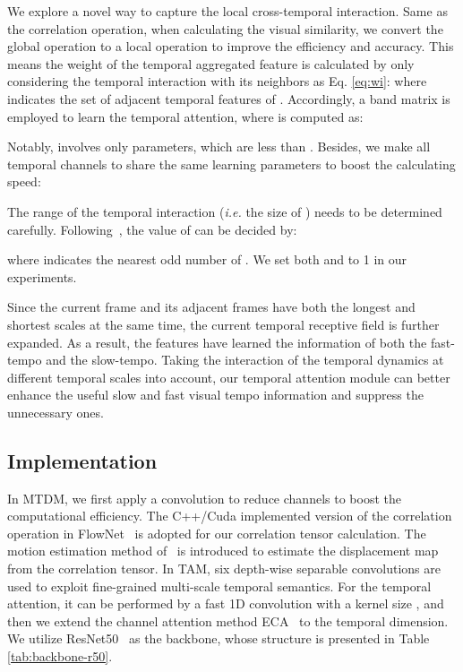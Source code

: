 \documentclass[journal]{IEEEtran}
\begin{document}
We explore a novel way to capture the local cross-temporal interaction. Same as the correlation operation, when calculating the visual similarity, we convert the global operation to a local operation to improve the efficiency and accuracy. This means the weight of the temporal aggregated feature  is calculated by only considering the temporal interaction with its  neighbors as Eq. \ref{eq:wi}:
where  indicates the set of  adjacent temporal features of . Accordingly, a band matrix  is employed to learn the temporal attention, where  is computed as:


Notably,  involves only  parameters, which are less than . Besides, we make all temporal channels to share the same learning parameters to boost the calculating speed:

The range of the temporal interaction (\textit{i.e.} the size of ) needs to be determined carefully. Following~\cite{Wang_2020_CVPR_eca}, the value of  can be decided by:

where  indicates the nearest odd number of . We set both  and  to 1 in our experiments.

Since the current frame and its adjacent frames have both the longest and shortest scales at the same time, the current temporal receptive field is further expanded. As a result, the features have learned the information of both the fast-tempo and the slow-tempo. Taking the interaction of the temporal dynamics at different temporal scales into account, our temporal attention module can better enhance the useful slow and fast visual tempo information and suppress the unnecessary ones.


\subsection{Implementation}
In MTDM, we first apply a  convolution to reduce channels to boost the computational efficiency.
The C++/Cuda implemented version of the correlation operation in FlowNet~\cite{dosovitskiy2015flownet} is adopted for our correlation tensor calculation.
The motion estimation method of~\cite{kwon2020motionsqueeze} is introduced to estimate the displacement map from the correlation tensor.
In TAM, six  depth-wise separable convolutions are used to exploit fine-grained multi-scale temporal semantics. For the temporal attention, it can be performed by a fast 1D convolution with a kernel size , and then we extend the channel attention method ECA~\cite{Wang_2020_CVPR_eca} to the temporal dimension.
We utilize ResNet50~\cite{he2016deep} as the backbone, whose structure is presented in Table \ref{tab:backbone-r50}.
\end{document}

